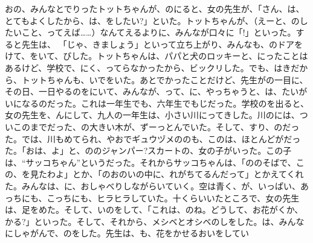 おの、みんなとでりったトットちゃんが、のにると、女の先生が、「さん、は、とてもよくしたから、は、をしたい?」といた。トットちゃんが、（えーと、のしたいこと、ってえば……）なんてえるよりに、みんなが口々に「!」といった。すると先生は、 「じゃ、きましょう」といって立ち上がり、みんなも、のドアをけて、をいて、びした。トットちゃんは、パパと犬のロッキーと、にったことはあるけど、学校で、にく、ってらなかったから、ビックリした。でも、はきだから、トットちゃんも、いでをいた。あとでかったことだけど、先生がの一目に、その日、一日やるのをにいて、みんなが、って、に、やっちゃうと、は、たいがいになるのだった。これは一年生でも、六年生でもじだった。学校のを出ると、女の先生を、んにして、九人の一年生は、小さい川にってきした。川のには、ついこのまでだった、の大きい木が、ずーっとんでいた。そして、すり、のだった。では、川もめてられ、やおでギュウヅメののも、このは、ほとんどがだった。「おは、よ」と、ののジャンパー?スカートの、女の子がいった。この子は、“サッコちゃん”というだった。それからサッコちゃんは、「ののそばで、この、を見たわよ」とか、「のおのいの中に、れがちてるんだって」とかえてくれた。みんなは、に、おしゃべりしながらいていく。空は青く、が、いっぱい、あっちにも、こっちにも、ヒラヒラしていた。十くらいいたところで、女の先生は、足をめた。そして、いのをして、「これは、のね。どうして、お花がくか、かる?」といった。そして、それから、メシベとオシベのしをした。は、みんなにしゃがんで、のをした。先生は、も、花をかせるおいをしてい